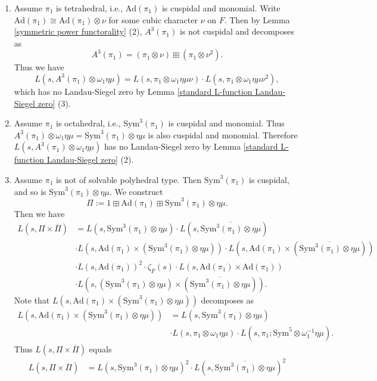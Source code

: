 \documentclass[12pt]{amsart}
\newcommand{\Ad}{\text{Ad}}
\newcommand{\Sym}{\text{Sym}}
\newcommand{\ov}{\overline}
\begin{document}
\begin{enumerate}
    \item Assume $\pi_1$ is tetrahedral, i.e., $\Ad(\pi_1)$ is cuspidal and monomial. Write $\Ad(\pi_1) \cong \Ad(\pi_1) \otimes \nu$ for some cubic character $\nu$ on $F$. Then by Lemma \ref{symmetric power functorality} (2), $A^3(\pi_1)$ is not cuspidal and decomposes as 
    $$A^3(\pi_1) = (\pi_1 \otimes \nu) \boxplus (\pi_1 \otimes \nu^2).$$
    Thus we have 
    $$L(s,A^3(\pi_1) \otimes \omega_1\eta\mu) = L(s,\pi_1 \otimes \omega_1\eta\mu\nu) \cdot L(s,\pi_1 \otimes \omega_1\eta\mu\nu^2),$$
    which has no Landau-Siegel zero by Lemma \ref{standard L-function Landau-Siegel zero} (3).
    \item Assume $\pi_1$ is octahedral, i.e., $\Sym^3(\pi_1)$ is cuspidal and monomial. Thus $A^3(\pi_1) \otimes \omega_1\eta\mu = \Sym^3(\pi_1) \otimes \eta\mu$ is also cuspidal and monomial. Therefore $L(s,A^3(\pi_1) \otimes \omega_1\eta\mu)$ has no Landau-Siegel zero by Lemma \ref{standard L-function Landau-Siegel zero} (2).
    \item Assume $\pi_1$ is not of solvable polyhedral type. Then $\Sym^3(\pi_1)$ is cuspidal, and so is $\Sym^3(\pi_1) \otimes \eta\mu$. We construct
    $$\Pi := 1 \boxplus \Ad(\pi_1) \boxplus \Sym^3(\pi_1) \otimes \eta\mu.$$
    Then we have 
    \begin{align*}
        L(s,\Pi \times \ov{\Pi}) &= L(s,\Sym^3(\pi_1) \otimes \eta\mu) \cdot L(s,\ov{\Sym^3(\pi_1) \otimes \eta\mu}) \\
        &\cdot L(s,\Ad(\pi_1) \times (\Sym^3(\pi_1) \otimes \eta\mu)) \cdot L(s,\Ad(\pi_1) \times (\ov{\Sym^3(\pi_1) \otimes \eta\mu})) \\
        &\cdot L(s,\Ad(\pi_1))^2 \cdot \zeta_F(s) \cdot L(s,\Ad(\pi_1) \times \Ad(\pi_1)) \\
        &\cdot L(s,(\Sym^3(\pi_1) \otimes \eta\mu) \times (\ov{\Sym^3(\pi_1) \otimes \eta\mu})).
    \end{align*}
    Note that $L(s,\Ad(\pi_1) \times (\Sym^3(\pi_1) \otimes \eta\mu))$ decomposes as 
    \begin{align*}
        L(s,\Ad(\pi_1) \times (\Sym^3(\pi_1) \otimes \eta\mu)) &= L(s,\Sym^3(\pi_1) \otimes \eta\mu) \\
        &\cdot L(s,\pi_1 \otimes \omega_1\eta\mu) \cdot L(s,\pi_1;\Sym^5 \otimes \omega_1^{-1}\eta\mu).
    \end{align*}
    Thus $L(s,\Pi \times \ov{\Pi})$ equals
    \begin{align*}
        L(s,\Pi \times \ov{\Pi}) &= L(s,\Sym^3(\pi_1) \otimes \eta\mu)^2 \cdot L(s,\ov{\Sym^3(\pi_1) \otimes \eta\mu})^2 \\

\end{align*}
\end{enumerate}
\end{document}
